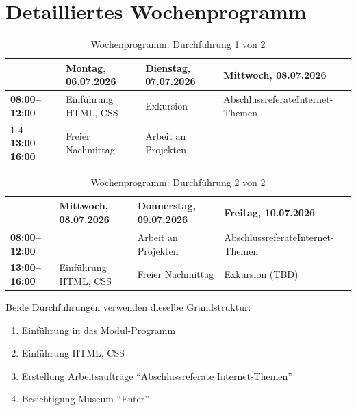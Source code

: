 \section{Detailliertes Wochenprogramm}


\begin{table}[H]
	\begin{tabular}{l||m{4.3cm}|m{4.3cm}|m{4.3cm}}
		                      & \textbf{Montag, 06.07.2026}                           & \textbf{Dienstag, 07.07.2026} & \textbf{Mittwoch, 08.07.2026}             \\\midrule\midrule
		\textbf{08:00--12:00} & Einführung \newline HTML, CSS                         & Exkursion                     & Abschlussreferate\newline Internet-Themen \\\cmidrule{1-4}
		\textbf{13:00--16:00} & \cellcolor{ForestGreen!10} Freier \newline Nachmittag & Arbeit an Projekten           & \cellcolor{gray!20}
	\end{tabular}
	\caption{Wochenprogramm: Durchführung 1 von 2}
\end{table}

\begin{table}[H]
	\begin{tabular}{l||m{4.3cm}|m{4.3cm}|m{4.3cm}}
		                      & \textbf{Mittwoch, 08.07.2026} & \textbf{Donnerstag, 09.07.2026}                       & \textbf{Freitag, 10.07.2026}              \\\midrule\midrule
		\textbf{08:00--12:00} & \cellcolor{gray!20}           & Arbeit an Projekten                                   & Abschlussreferate\newline Internet-Themen \\\midrule
		\textbf{13:00--16:00} & Einführung \newline HTML, CSS & \cellcolor{ForestGreen!10} Freier \newline Nachmittag & Exkursion (TBD)
	\end{tabular}
	\caption{Wochenprogramm: Durchführung 2 von 2}
\end{table}

Beide Durchführungen verwenden dieselbe Grundstruktur:
\begin{enumerate}
	\item Einführung in das Modul-Programm
	\item Einführung HTML, CSS
	\item Erstellung Arbeitsaufträge \enquote{Abschlussreferate Internet-Themen}
	\item Besichtigung Museum \enquote{Enter}
\end{enumerate}

